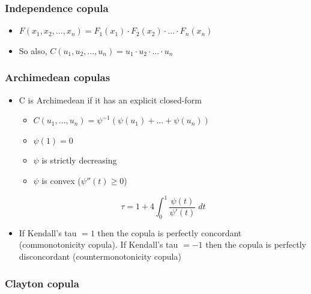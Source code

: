 \documentclass{article}
\begin{document}
\subsubsection{Independence copula}
\begin{itemize}
    \item $F(x_1,x_2, ..., x_n) = F_1(x_1) \cdot F_2(x_2) \cdot ... \cdot F_n(x_n)$
    \item So also, $C(u_1,u_2, ..., u_n) = u_1 \cdot u_2 \cdot ... \cdot u_n$
\end{itemize}

\subsubsection{Archimedean copulas}

\begin{itemize}
    \item C is Archimedean if it has an explicit closed-form
    \begin{itemize}
        \item $C(u_1, ..., u_n) = \psi^{-1}(\psi(u_1) + ... + \psi (u_n))$
        \item $\psi(1) = 0$
        \item $\psi$ is strictly decreasing
        \item $\psi$ is convex ($\psi''(t) \geq 0$)
    \end{itemize}
    \begin{equation*}
        \tau = 1 + 4 \int_0^1 \frac{\psi(t)}{\psi'(t)} \; dt
    \end{equation*}
    \item If Kendall's tau $=1$ then the copula is perfectly concordant (commonotonicity copula). If Kendall's tau $ = -1$ then the copula is perfectly disconcordant (countermonotonicity copula)
\end{itemize}

\subsubsection{Clayton copula}
\end{document}
